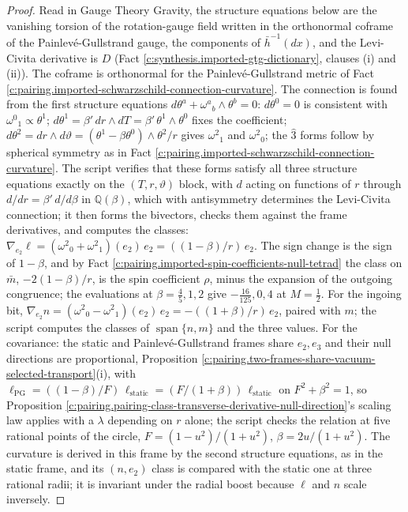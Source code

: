 \documentclass[11pt]{article}
\theoremstyle{definition}
\theoremstyle{plain}
\providecommand{\Q}{}\renewcommand{\Q}{\mathbb{Q}}
\providecommand{\hb}{}\renewcommand{\hb}{\bar{h}}
\providecommand{\mb}{}\renewcommand{\mb}{\bar m}
\begin{document}
\begin{proof}
Read in Gauge Theory Gravity, the structure equations below are the vanishing torsion of the rotation-gauge field written in the orthonormal coframe of the Painlev\'e-Gullstrand gauge, the components of $\hb^{-1}(dx)$, and the Levi-Civita derivative is $D$ (Fact \ref{c:synthesis.imported-gtg-dictionary}, clauses (i) and (ii)). The coframe is orthonormal for the Painlev\'e-Gullstrand metric of Fact \ref{c:pairing.imported-schwarzschild-connection-curvature}. The connection is found from the first structure equations $d\theta^{a} + \omega^{a}{}_{b}\wedge\theta^{b} = 0$: $d\theta^{0} = 0$ is consistent with $\omega^{0}{}_{1} \propto \theta^{1}$; $d\theta^{1} = \beta'\,dr\wedge dT = \beta'\,\theta^{1}\wedge\theta^{0}$ fixes the coefficient; $d\theta^{2} = dr\wedge d\vartheta = (\theta^{1} - \beta\theta^{0})\wedge\theta^{2}/r$ gives $\omega^{2}{}_{1}$ and $\omega^{2}{}_{0}$; the $\hat3$ forms follow by spherical symmetry as in Fact \ref{c:pairing.imported-schwarzschild-connection-curvature}. The script verifies that these forms satisfy all three structure equations exactly on the $(T, r, \vartheta)$ block, with $d$ acting on functions of $r$ through $d/dr = \beta'\,d/d\beta$ in $\Q(\beta)$, which with antisymmetry determines the Levi-Civita connection; it then forms the bivectors, checks them against the frame derivatives, and computes the classes: $\nabla_{e_{2}}\ell = (\omega^{2}{}_{0} + \omega^{2}{}_{1})(e_{2})\,e_{2} = ((1 - \beta)/r)\,e_{2}$. The sign change is the sign of $1 - \beta$, and by Fact \ref{c:pairing.imported-spin-coefficients-null-tetrad} the class on $\mb$, $-2(1 - \beta)/r$, is the spin coefficient $\rho$, minus the expansion of the outgoing congruence; the evaluations at $\beta = \tfrac45, 1, 2$ give $-\tfrac{16}{125}, 0, 4$ at $M = \tfrac12$. For the ingoing bit, $\nabla_{e_{2}}n = (\omega^{2}{}_{0} - \omega^{2}{}_{1})(e_{2})\,e_{2} = -((1 + \beta)/r)\,e_{2}$, paired with $m$; the script computes the classes of $\operatorname{span}\{n, m\}$ and the three values. For the covariance: the static and Painlev\'e-Gullstrand frames share $e_{2}, e_{3}$ and their null directions are proportional, Proposition \ref{c:pairing.two-frames-share-vacuum-selected-transport}(i), with $\ell_{\mathrm{PG}} = ((1 - \beta)/F)\,\ell_{\mathrm{static}} = (F/(1 + \beta))\,\ell_{\mathrm{static}}$ on $F^{2} + \beta^{2} = 1$, so Proposition \ref{c:pairing.pairing-class-transverse-derivative-null-direction}'s scaling law applies with a $\lambda$ depending on $r$ alone; the script checks the relation at five rational points of the circle, $F = (1 - u^{2})/(1 + u^{2})$, $\beta = 2u/(1 + u^{2})$. The curvature is derived in this frame by the second structure equations, as in the static frame, and its $(n, e_{2})$ class is compared with the static one at three rational radii; it is invariant under the radial boost because $\ell$ and $n$ scale inversely.

\end{proof}
\end{document}
